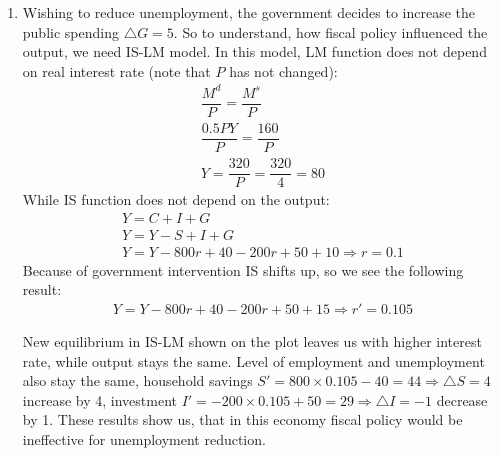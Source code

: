 \documentclass[a4paper,12pt]{article} %
\begin{document}
\begin{enumerate}[label=\alph*)]
\item  Wishing to reduce unemployment, the government decides to increase the public spending $ \bigtriangleup G = 5 $.  
So to understand, how fiscal policy influenced the output, we need IS-LM model. 
In this model, LM function does not depend on real interest rate (note that $ P $ has not changed):
\begin{gather*}
\dfrac{M^{d}}{P} = \dfrac{M^{s}}{P} \\
\dfrac{0.5PY}{P} = \dfrac{160}{P} \\
Y=\dfrac{320}{P} = \dfrac{320}{4} = 80
\end{gather*}
While IS function does not depend on the output: 
\begin{gather*}
Y = C + I + G \\
Y = Y - S + I + G \\
Y = Y - 800r + 40  -200r + 50 + 10   \Rightarrow  r=0.1
 \end{gather*}
Because of government intervention IS shifts up, so we see the following result:
\begin{gather*}
Y = Y - 800r + 40  -200r + 50 + 15   \Rightarrow  r'=0.105 
\end{gather*}



New equilibrium in IS-LM shown on the plot leaves us with higher interest rate, while  output stays the same. Level of employment and unemployment also stay the same,  household savings  
$ S' = 800 \times 0.105 - 40 = 44  \Rightarrow \bigtriangleup S=4 $ increase by 4, investment 
$ I' = -200 \times 0.105 + 50 = 29  \Rightarrow \bigtriangleup I=-1 $ decrease by 1. These results show us, that in this economy fiscal policy would be ineffective  for unemployment reduction.



\end{enumerate}
\end{document}
